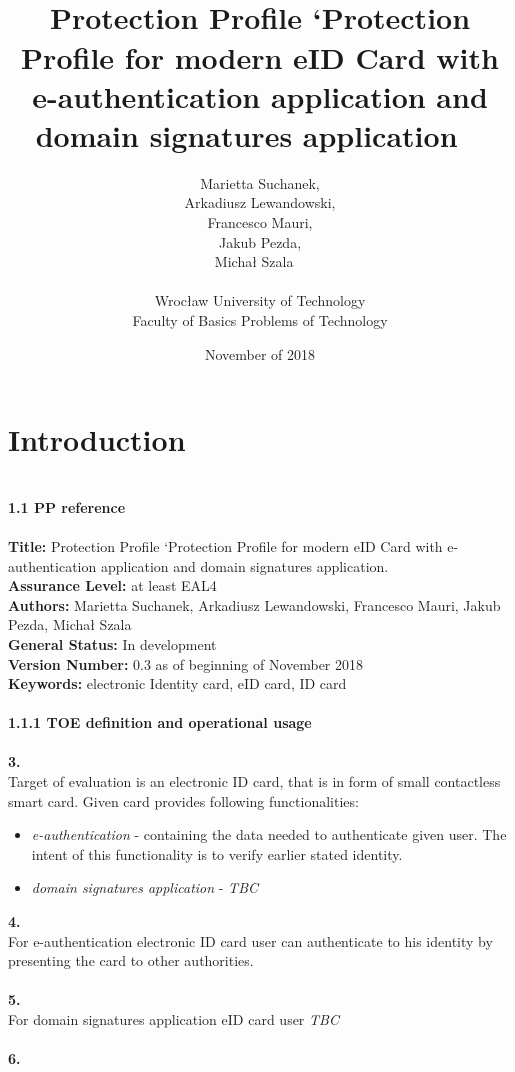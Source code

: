 \documentclass[a4paper, 11pt]{article}%
\title{\vspace*{1.5cm}~\\Protection Profile ‘Protection Profile for modern eID Card with e-authentication application and domain signatures application \vspace*{6cm}~\\}
\date{November of 2018}
\author{Marietta Suchanek,\\ Arkadiusz Lewandowski,\\ Francesco Mauri,\\ Jakub Pezda,\\ Michał Szala\vspace*{4cm} ~\\~\\ Wrocław University of Technology\\Faculty of Basics Problems of Technology
}
\begin{document}
\maketitle
\newpage
\section{\huge{Introduction}}
~\\\textbf{\Large{1.1 PP reference}}\\\\
\textbf{Title:} Protection Profile ‘Protection Profile for modern eID Card with e-authentication application and domain signatures application.\\
\textbf{Assurance Level:} at least  EAL4\\
\textbf{Authors:} Marietta Suchanek, Arkadiusz Lewandowski, Francesco Mauri, Jakub Pezda, Michał Szala\\
\textbf{General Status:} In development\\
\textbf{Version Number:} 0.3 as of beginning of November 2018\\
\textbf{Keywords:} electronic Identity card, eID card, ID card\\\\
\textbf{\large{1.1.1 TOE definition and operational usage}}\\\\
\textbf{3.}\\
Target of evaluation is an electronic ID card, that is in form of small contactless smart card. Given card provides following functionalities:
\begin{itemize}
\item{\textit{e-authentication} - containing the data needed to authenticate given user. The intent of this functionality is to verify earlier stated identity.}
\item{\textit{domain signatures application} - \textit{TBC}}
\end{itemize}
\textbf{4.}\\
For e-authentication electronic ID card user can authenticate to his identity by presenting the card to other authorities.\\\\
\textbf{5.}\\
For domain signatures application eID card user \textit{TBC}\\\\
\textbf{6.}\\
\end{document}
